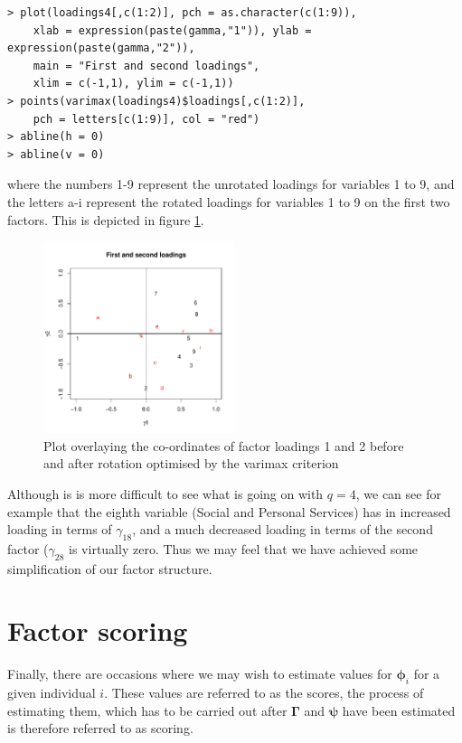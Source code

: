 \singlespacing
\begin{verbatim}
> plot(loadings4[,c(1:2)], pch = as.character(c(1:9)), 
    xlab = expression(paste(gamma,"1")), ylab = expression(paste(gamma,"2")),
    main = "First and second loadings", 
    xlim = c(-1,1), ylim = c(-1,1))
> points(varimax(loadings4)$loadings[,c(1:2)], 
    pch = letters[c(1:9)], col = "red")
> abline(h = 0)
> abline(v = 0)
\end{verbatim}
\onehalfspacing

where the numbers 1-9 represent the unrotated loadings for variables 1 to 9, and the letters a-i represent the rotated loadings for variables 1 to 9 on the first two factors.   This is depicted in figure \ref{farotation}.


\begin{figure}
\begin{center}
\includegraphics[width = 0.5\textwidth]{images/farotation}
\caption{Plot overlaying the co-ordinates of factor loadings 1 and 2 before and after rotation optimised by the varimax criterion}
\label{farotation}
\end{center}
\end{figure}

Although is is more difficult to see what is going on with $q=4$, we can see for example that the eighth variable (Social and Personal Services) has in increased loading in terms of $\gamma_{18}$, and a much decreased loading in terms of the second factor ($\gamma_{28}$ is virtually zero.   Thus we may feel that we have achieved some simplification of our factor structure.

\section{Factor scoring}

Finally, there are occasions where we may wish to estimate values for $\boldsymbol{\phi}_{i}$ for a given individual $i$.   These values are referred to as the scores, the process of estimating them, which has to be carried out after $\boldsymbol{\Gamma}$ and $\boldsymbol{\psi}$ have been estimated is therefore referred to as scoring.

